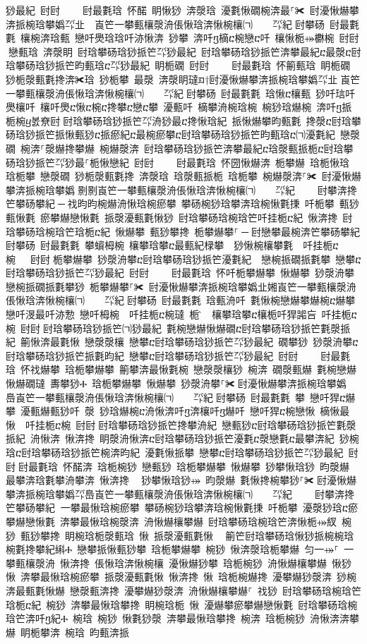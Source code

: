 ﻿\documentclass[output=paper]{langsci/langscibook}
\begin{document}
\begin{exe}
{\begin{exe}
猀最紀 尀尀਀    尀最氀琀 怀䤀 眀愀猀 渀漀琀 瀀氀愀礀椀渀最⸀✀ 尀瀀愀爀攀渀挀椀琀攀嬀㌀㐀　崀笀一攀甀欀漀洀倀愀琀渀愀椀欀㈀　　㌀紀਀尀攀砀 尀最氀氀 欀椀渀琀甀 戀吀爂琀琀吀洂愀渀 猀攀 渀吀ⴂ樀ⴀ椀戀ⴀ吀 欀愀栀⤀欁椀 尀尀਀戀甀琀 渀漀眀 尀琀攀砀琀猀挀笀㌀猀最紀 尀琀攀砀琀猀挀笀渀攀最紀ⴀ最漀ⴀ尀琀攀砀琀猀挀笀昀甀琀ⴀ㌀猀最紀 眀栀礀 尀尀਀    尀最氀琀 怀䈀甀琀 眀栀礀 猀栀漀甀氀搀渀✀琀 猀栀攀 最漀 渀漀眀㼀ᤀ†尀瀀愀爀攀渀挀椀琀攀嬀㌀㐀㄀崀笀一攀甀欀漀洀倀愀琀渀愀椀欀㈀　　㌀紀਀尀攀砀 尀最氀氀 琀愀ⴀ欀甀 猀吀琂吀爂欀吀 欀吀爂ⴀ愀ⴀ椀ⴀ搀攀ⴀ戀ⴀ攀 瀀甀吀 樀攀洀椀琀椀 椀猀琀爀椀 渀吀ⴂ挀栀椀ⴁ봀尞尀਀尀琀攀砀琀猀挀笀㌀洀猀最ⴀ搀愀琀紀 挀愀爀攀昀甀氀 搀漀ⴀ尀琀攀砀琀猀挀笀挀愀甀猀ⴀ挀瘀紀ⴀ最椀瘀攀ⴀ尀琀攀砀琀猀挀笀昀甀琀ⴀ㈀瀀氀紀 戀漀礀 椀渀⸀漀爀搀攀爀 椀爀漀渀 尀琀攀砀琀猀挀笀渀攀最紀ⴀ琀漀甀挀栀ⴀ尀琀攀砀琀猀挀笀㌀猀最⸀栀愀戀紀 尀尀਀    尀最氀琀 怀圀愀爀渀 栀攀爀 琀栀愀琀 琀栀攀 戀漀礀 猀栀漀甀氀搀 渀漀琀 琀漀甀挀栀 琀栀攀 椀爀漀渀⸀✀ 尀瀀愀爀攀渀挀椀琀攀嬀㄀㔀㔀崀笀一攀甀欀漀洀倀愀琀渀愀椀欀㈀　　㌀紀਀    尀攀渀搀笀攀砀攀紀਀─਀䄀昀昀椀爀洀愀琀椀瘀攀 攀砀椀猀琀攀渀琀椀愀氀㨀 吀栀攀 甀猀甀愀氀 瘀攀爀戀愀氀 挀漀瀀甀氀愀猀 尀琀攀砀琀椀琀笀吀挂栀ⴀ紀 愀渀搀 尀琀攀砀琀椀琀笀琀栀ⴀ紀 愀爀攀 甀猀攀搀 栀攀爀攀⸀਀─਀尀戀攀最椀渀笀攀砀攀紀尀攀砀 尀最氀氀 攀蠀栂椀 欀攀琀攀ⴀ最甀紀椂攀  猀愀椀欀攀氀  吀挂栀ⴀ椀   尀尀਀栀攀爀攀 猀漀洀攀ⴀ尀琀攀砀琀猀挀笀瀀氀紀  戀椀挀礀挀氀攀 戀攀ⴀ尀琀攀砀琀猀挀笀㌀猀最紀 尀尀਀    尀最氀琀 怀吀栀攀爀攀 愀爀攀 猀漀洀攀 戀椀挀礀挀氀攀猀 栀攀爀攀⸀✀ 尀瀀愀爀攀渀挀椀琀攀嬀㐀㜀崀笀一攀甀欀漀洀倀愀琀渀愀椀欀㈀　　㌀紀਀尀攀砀 尀最氀氀 琀甀洀吀 氀愀椀戀爀攀爀椀ⴀ爀攀 戀吀渂最吀洂愂 戀吀栂椀  吀挂栀ⴀ椀㼀 栀吀̂ 欀攀琀攀ⴀ欀栀吀猂嘂吂 吀挂栀ⴀ椀 尀尀਀尀琀攀砀琀猀挀笀㈀猀最紀 氀椀戀爀愀爀礀ⴀ尀琀攀砀琀猀挀笀氀漀挀紀 䈀愀渀最氀愀 戀漀漀欀 戀攀ⴀ尀琀攀砀琀猀挀笀㌀猀最紀 礀攀猀 猀漀洀攀ⴀ尀琀攀砀琀猀挀笀挀氀昀紀 戀攀ⴀ尀琀攀砀琀猀挀笀㌀猀最紀 尀尀਀    尀最氀琀 怀䄀爀攀 琀栀攀爀攀 䈀攀渀最愀氀椀 戀漀漀欀猀 椀渀 礀漀甀爀 氀椀戀爀愀爀礀㼀 夀攀猀Ⰰ 琀栀攀爀攀 愀爀攀 猀漀洀攀⸀✀਀尀瀀愀爀攀渀挀椀琀攀嬀㄀㄀㠀崀笀一攀甀欀漀洀倀愀琀渀愀椀欀㈀　　㌀紀਀尀攀砀 尀最氀氀 攀 戀吀猂ⴀ爀攀 瀀甀爀甀猀吀 漀 猀琀爀椀ⴀ洀愀渀吀ⴂ渀欀吀ⴂ爀吀 戀吀猂ⴀ椀戀愀 樀愀最愀  吀挂栀ⴀ椀 尀尀਀尀琀攀砀琀猀挀笀搀攀洀紀 戀甀猀ⴀ尀琀攀砀琀猀挀笀氀漀挀紀 洀愀渀 愀渀搀 眀漀洀愀渀ⴀ尀琀攀砀琀猀挀笀瀀氀ⴀ漀戀氀ⴀ最攀渀紀 猀椀琀ⴀ尀琀攀砀琀猀挀笀椀渀昀紀 瀀氀愀挀攀 戀攀ⴀ尀琀攀砀琀猀挀笀㌀猀最紀 尀尀਀尀最氀琀 怀䤀渀 琀栀椀猀 戀甀猀 琀栀攀爀攀 愀爀攀 猀攀愀琀猀 昀漀爀 最攀渀琀氀攀洀攀渀 愀渀搀 ⠀猀攀愀琀猀⤀ 昀漀爀 氀愀搀椀攀猀⸀✀਀尀瀀愀爀攀渀挀椀琀攀嬀㌀㠀崀笀一攀甀欀漀洀倀愀琀渀愀椀欀㈀　　㌀紀਀    尀攀渀搀笀攀砀攀紀਀਀一攀最愀琀椀瘀攀 攀砀椀猀琀攀渀琀椀愀氀㨀 吀栀攀 瀀漀猀琀ⴀ瘀攀爀戀愀氀 渀攀最愀琀椀漀渀 洀愀爀欀攀爀 尀琀攀砀琀椀琀笀渀愀栀⤀紁 椀猀 甀猀攀搀 眀椀琀栀漀甀琀 愀 挀漀瀀甀氀愀 ⠀䈀笀尀琀攀砀琀愀猀挀椀椀琀椀氀搀攀紀䌀Ⰰ 戀攀挀愀甀猀攀 琀栀攀爀攀 椀猀 愀渀漀琀栀攀爀 匀一⤀⸀ 一攀甀欀漀洀 愀渀搀 倀愀琀渀愀椀欀 瀀愀爀猀攀 琀栀椀猀 洀愀爀欀攀爀 愀猀 愀 渀攀最愀琀椀瘀攀 挀漀瀀甀氀愀 愀渀搀 愀 琀栀椀爀搀 瀀攀爀猀漀渀 猀椀渀最甀氀愀爀 戀漀甀渀搀 瀀攀爀猀漀渀 洀愀爀欀攀爀⸀ 䄀猀 尀琀攀砀琀椀琀笀琀栀ⴀ紀 椀猀 渀攀最愀琀攀搀 眀椀琀栀 愀 瀀爀攀瘀攀爀戀愀氀 尀琀攀砀琀椀琀笀渀吀ⴂ紀Ⰰ 椀琀 椀猀 愀氀猀漀 渀攀最愀琀攀搀 椀渀 琀栀椀猀 洀愀渀渀攀爀 眀栀攀渀 椀琀 昀甀渀挀
\end{exe}}
\end{exe}
\end{document}
